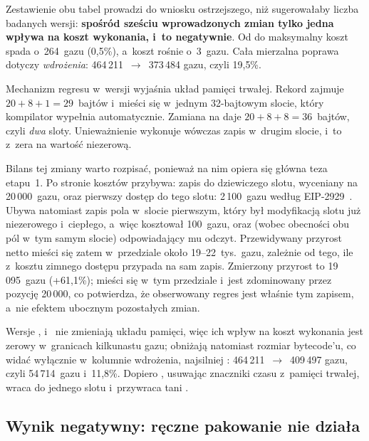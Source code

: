 Zestawienie obu tabel prowadzi do wniosku ostrzejszego, niż sugerowałaby liczba
badanych wersji: \textbf{spośród sześciu wprowadzonych zmian tylko jedna wpływa
na koszt wykonania, i~to negatywnie}. Od  do
 maksymalny koszt  spada o~264~gazu (0{,}5\%),
a~koszt  rośnie o~3~gazu. Cała mierzalna poprawa dotyczy
\emph{wdrożenia}: 464\,211~$\to$~373\,484 gazu, czyli 19{,}5\%.

Mechanizm regresu w~wersji  wyjaśnia układ pamięci trwałej.
Rekord  zajmuje $20 + 8 + 1 = 29$~bajtów i~mieści się
w~jednym 32-bajtowym slocie, który kompilator wypełnia automatycznie. Zamiana
 na  daje $20 + 8 + 8 = 36$~bajtów,
czyli \emph{dwa} sloty. Unieważnienie wykonuje wówczas zapis 
w~drugim slocie, i~to z~zera na wartość niezerową.

Bilans tej zmiany warto rozpisać, ponieważ na nim opiera się główna teza
etapu~1. Po stronie kosztów przybywa: zapis do dziewiczego slotu, wyceniany na
20\,000~gazu, oraz pierwszy dostęp do tego slotu: 2\,100~gazu według
EIP-2929~\cite{eip2929}. Ubywa natomiast zapis pola  w~slocie
pierwszym, który był modyfikacją slotu już niezerowego i~ciepłego, a~więc
kosztował 100~gazu, oraz (wobec obecności obu pól w~tym samym slocie)
odpowiadający mu odczyt. Przewidywany przyrost netto mieści się zatem
w~przedziale około 19--22~tys.\ gazu, zależnie od tego, ile z~kosztu zimnego
dostępu przypada na sam zapis. Zmierzony przyrost to 19\,095~gazu (+61{,}1\%);
mieści się w~tym przedziale i~jest zdominowany przez pozycję 20\,000, co
potwierdza, że obserwowany regres jest właśnie tym zapisem, a~nie efektem
ubocznym pozostałych zmian.

Wersje ,  i~ nie
zmieniają układu pamięci, więc ich wpływ na koszt wykonania jest zerowy
w~granicach kilkunastu gazu; obniżają natomiast rozmiar bytecode'u, co widać
wyłącznie w~kolumnie wdrożenia, najsilniej :
464\,211~$\to$~409\,497 gazu, czyli 54\,714~gazu i~11{,}8\%. Dopiero
, usuwając znaczniki czasu z~pamięci trwałej, wraca do
jednego slotu i~przywraca tani .

\subsection{Wynik negatywny: ręczne pakowanie nie działa}
\label{sec:gaz-packed}

